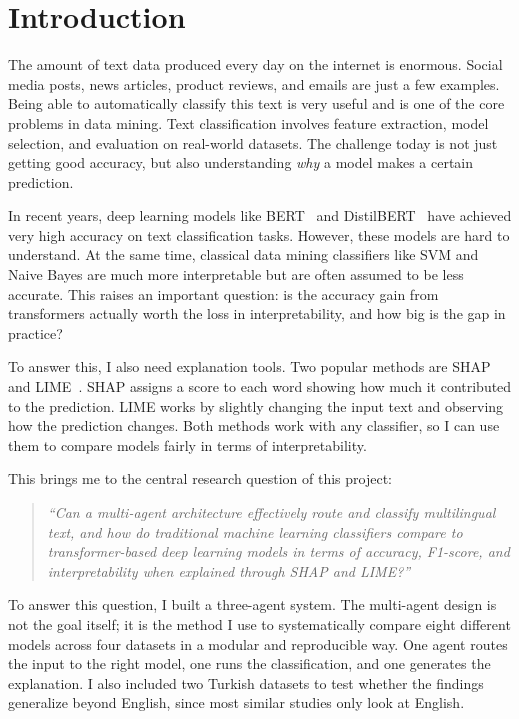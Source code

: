 \documentclass[conference]{IEEEtran}
\begin{document}
\section{Introduction}
\label{sec:introduction}

The amount of text data produced every day on the internet is enormous. Social media posts,
news articles, product reviews, and emails are just a few examples. Being able to
automatically classify this text is very useful and is one of the core problems in data
mining. Text classification involves feature extraction, model selection, and evaluation on
real-world datasets. The challenge today is not just getting good accuracy, but also
understanding \textit{why} a model makes a certain prediction.

In recent years, deep learning models like BERT~\cite{b2} and DistilBERT~\cite{b3} have
achieved very high accuracy on text classification tasks. However, these models are hard to
understand. At the same time, classical data mining classifiers like SVM and Naive Bayes are
much more interpretable but are often assumed to be less accurate. This raises an important
question: is the accuracy gain from transformers actually worth the loss in interpretability,
and how big is the gap in practice?

To answer this, I also need explanation tools. Two popular methods are SHAP~\cite{b4} and
LIME~\cite{b5}. SHAP assigns a score to each word showing how much it contributed to the
prediction. LIME works by slightly changing the input text and observing how the prediction
changes. Both methods work with any classifier, so I can use them to compare models fairly
in terms of interpretability.

This brings me to the central research question of this project:

\begin{quote}
\textit{``Can a multi-agent architecture effectively route and classify multilingual text,
and how do traditional machine learning classifiers compare to transformer-based deep
learning models in terms of accuracy, F1-score, and interpretability when explained through
SHAP and LIME?''}
\end{quote}

To answer this question, I built a three-agent system. The multi-agent design is not the
goal itself; it is the method I use to systematically compare eight different models
across four datasets in a modular and reproducible way. One agent routes the input to the
right model, one runs the classification, and one generates the explanation. I also included
two Turkish datasets to test whether the findings generalize beyond English, since most
similar studies only look at English.
\end{document}
